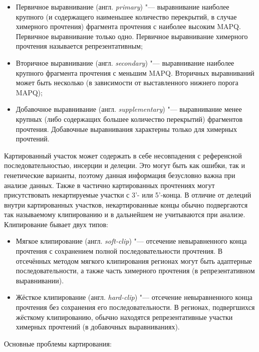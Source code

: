 \documentclass[a4paper,14pt]{extarticle}
\newcommand{\engterm}[1]{англ. \textenglish{\textit{#1}}}
\begin{document}
\begin{itemize}
	\item Первичное выравнивание (\engterm{primary}) "--- выравнивание наиболее крупного (и содержащего наименьшее количество перекрытий, в случае химерного прочтения) фрагмента прочтения с наиболее высоким MAPQ.
	      Первичное выравнивание только одно.
	      Первичное выравнивание химерного прочтения называется репрезентативным;
	\item Вторичное выравнивание (\engterm{secondary}) "--- выравнивание наиболее крупного фрагмента прочтения с меньшим MAPQ.
	      Вторичных выравниваний может быть несколько (в зависимости от выставленного нижнего порога MAPQ);
	\item Добавочное выравнивание (\engterm{supplementary}) "--- выравнивание менее крупных (либо содержащих большее количество перекрытий) фрагментов прочтения.
	      Добавочные выравнивания характерны только для химерных прочтений.
\end{itemize}

Картированный участок может содержать в себе несовпадения с референсной последовательностью, инсерции и делеции.
Это могут быть как ошибки, так и генетические варианты, поэтому данная информация безусловно важна при анализе данных.
Также в частично картированных прочтениях могут присутствовать некартируемые участки с 3'- или 5'-конца.
В отличие от делеций внутри картированных участков, некартированные концы обычно подвергаются так называемому клипированию и в дальнейшем не учитываются при анализе.
Клипирование бывает двух типов:

\begin{itemize}
	\item Мягкое клипирование (\engterm{soft-clip}) "--- отсечение невыравненного конца прочтения с сохранением полной последовательности прочтения.
	      В отсечённых методом мягкого клипирования регионах могут быть адаптерные последовательности, а также часть химерного прочтения (в репрезентативном выравнивании).
	\item Жёсткое клипирование (\engterm{hard-clip}) "--- отсечение невыравненного конца прочтения без сохранения его последовательности.
	      В регионах, подвергшихся жёсткому клипированию, обычно находятся репрезентативные участки химерных прочтений (в добавочных выравниваниях).
\end{itemize}

Основные проблемы картирования:
\end{document}
